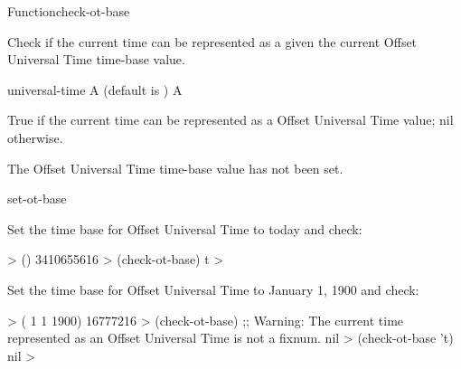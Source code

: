 \documentclass[10pt,twoside,english,pdftex]{article}
\begin{document}

\begin{functiondoc}{Function}{check-ot-base}{
    \returns{} }

%

\fnsyntax

\fnpurpose Check if the current time can be represented as a 
given the current Offset Universal Time time-base value.

\fnpackage {}

\fnmodule {}

\fnargs
\begin{args}{universal-time}
 A  (default is \nil)
\arg[boolean] A 
\end{args}

\fnreturns True if the current time can be represented as a 
Offset Universal Time value; nil otherwise.

\fnerrors The Offset Universal Time time-base value has not been set.

\begin{alsos}{set-ot-base}
\also[*ot-base*]
\also[ot2ut]
\also[ut2ot]
\end{alsos}

\fnexamples
Set the time base for Offset Universal Time to today and check:
%
\W\supp
\begin{example}
  > ()
  3410655616
  > (check-ot-base)
  t
  >
\end{example}
%
Set the time base for Offset Universal Time to January 1, 1900 and check:
%
\W\supp\notpretop
\begin{example}
  > ( 1 1 1900)
  16777216
  > (check-ot-base)
  ;; Warning: The current time represented as an Offset Universal Time is not a fixnum.
  nil
  > (check-ot-base 't)
  nil
  >
\end{example}

\end{functiondoc}

\end{document}
